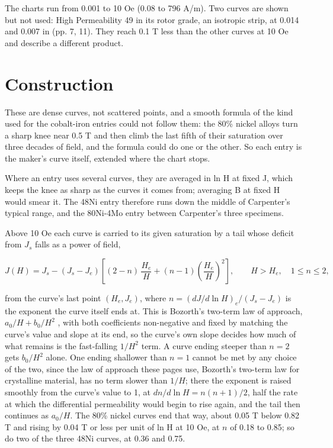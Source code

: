 \documentclass[
  11pt,
]{article}
\begin{document}
The charts run from 0.001 to 10 Oe (0.08 to 796 A/m). Two curves are shown but not used: High Permeability 49 in its rotor grade, an isotropic strip, at 0.014 and 0.007 in (pp. 7, 11). They reach 0.1 T less than the other curves at 10 Oe and describe a different product.

\section{Construction}\label{construction}

These are dense curves, not scattered points, and a smooth formula of the kind used for the cobalt-iron entries \cite{meeker-cofe} could not follow them: the 80\% nickel alloys turn a sharp knee near 0.5 T and then climb the last fifth of their saturation over three decades of field, and the formula could do one or the other. So each entry is the maker's curve itself, extended where the chart stops.

Where an entry uses several curves, they are averaged in ln H at fixed J, which keeps the knee as sharp as the curves it comes from; averaging B at fixed H would smear it. The 48Ni entry therefore runs down the middle of Carpenter's typical range, and the 80Ni-4Mo entry between Carpenter's three specimens.

Above 10 Oe each curve is carried to its given saturation by a tail whose deficit from \(J_s\) falls as a power of field,

\begin{equation}\label{eq:tail}
J(H) = J_s - (J_s - J_e)\left[(2-n)\,\frac{H_e}{H} + (n-1)\left(\frac{H_e}{H}\right)^{2}\right], \qquad H > H_e,\quad 1 \le n \le 2,
\end{equation}

from the curve's last point \((H_e, J_e)\), where \(n = (dJ/d\ln H)_e/(J_s - J_e)\) is the exponent the curve itself ends at. This is Bozorth's two-term law of approach, \(a_0/H + b_0/H^{2}\) \cite{bozorth1951}, with both coefficients non-negative and fixed by matching the curve's value and slope at its end, so the curve's own slope decides how much of what remains is the fast-falling \(1/H^{2}\) term. A curve ending steeper than \(n = 2\) gets \(b_0/H^{2}\) alone. One ending shallower than \(n = 1\) cannot be met by any choice of the two, since the law of approach these pages use, Bozorth's two-term law for crystalline material, has no term slower than \(1/H\); there the exponent is raised smoothly from the curve's value to 1, at \(dn/d\ln H = n(n+1)/2\), half the rate at which the differential permeability would begin to rise again, and the tail then continues as \(a_0/H\). The 80\% nickel curves end that way, about 0.05 T below 0.82 T and rising by 0.04 T or less per unit of ln H at 10 Oe, at \(n\) of 0.18 to 0.85; so do two of the three 48Ni curves, at 0.36 and 0.75.
\end{document}
